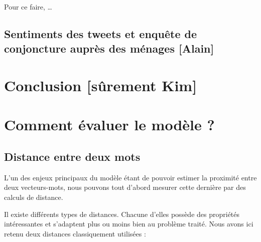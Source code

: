\documentclass[11pt,french,french]{article}
\begin{document}
Pour ce faire, \ldots{}

\subsection{Sentiments des tweets et enquête de conjoncture auprès des
ménages
{[}Alain{]}}\label{sentiments-des-tweets-et-enquuxeate-de-conjoncture-aupruxe8s-des-muxe9nages-alain}

\section*{Conclusion {[}sûrement
Kim{]}}\label{conclusion-suxfbrement-kim}

\newpage

\appendix


\section{Comment évaluer le modèle ?}\label{annexe:commentEvaluer}

\subsection{Distance entre deux mots}\label{distance-entre-deux-mots}

L'un des enjeux principaux du modèle étant de pouvoir estimer la
proximité entre deux vecteurs-mots, nous pouvons tout d'abord mesurer
cette dernière par des calculs de distance.

Il existe différents types de distances. Chacune d'elles possède des
propriétés intéressantes et s'adaptent plus ou moins bien au problème
traité. Nous avons ici retenu deux distances classiquement utilisées :
\end{document}
